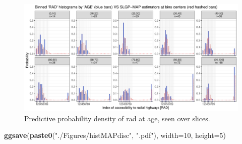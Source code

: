 \documentclass[
]{article}
\newenvironment{Shaded}{\begin{snugshade}}{\end{snugshade}}
\newcommand{\AttributeTok}[1]{\textcolor[rgb]{0.13,0.29,0.53}{#1}}
\newcommand{\DecValTok}[1]{\textcolor[rgb]{0.00,0.00,0.81}{#1}}
\newcommand{\FunctionTok}[1]{\textcolor[rgb]{0.13,0.29,0.53}{\textbf{#1}}}
\newcommand{\NormalTok}[1]{#1}
\newcommand{\StringTok}[1]{\textcolor[rgb]{0.31,0.60,0.02}{#1}}
\begin{document}
\begin{figure}[H]

{\centering \includegraphics{IntroductionSLGP_files/figure-latex/SLGPplotting2disc-1} 

}

\caption{Predictive probability density of rad at age, seen over slices.}\label{fig:SLGPplotting2disc}
\end{figure}

\begin{Shaded}
\begin{Highlighting}[]
\FunctionTok{ggsave}\NormalTok{(}\FunctionTok{paste0}\NormalTok{(}\StringTok{"./Figures/histMAPdisc"}\NormalTok{,  }\StringTok{".pdf"}\NormalTok{), }\AttributeTok{width=}\DecValTok{10}\NormalTok{, }\AttributeTok{height=}\DecValTok{5}\NormalTok{)}
\end{Highlighting}
\end{Shaded}
\end{document}
